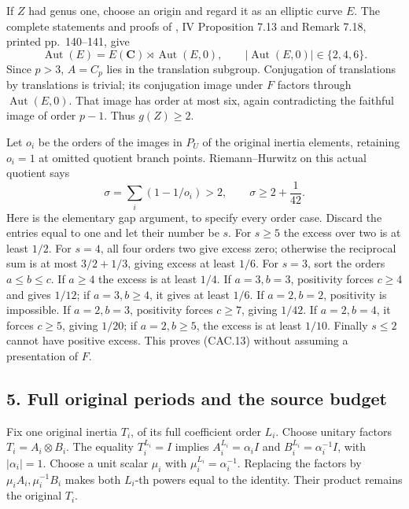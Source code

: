 If \(Z\) had genus one, choose an origin and regard it as an
elliptic curve \(E\). The complete statements and proofs of
\cite{TD:MilneEC2021}, IV Proposition 7.13 and Remark 7.18,
printed pp.~140--141, give
\[
 \operatorname{Aut}(E)
   =E(\mathbf C)\rtimes\operatorname{Aut}(E,0),
 \qquad
 |\operatorname{Aut}(E,0)|\in\{2,4,6\}.
 \tag{CAC.12}
\]
Since \(p>3\), \(A=C_p\) lies in the translation subgroup.
Conjugation of translations by translations is trivial;
its conjugation image under \(F\) factors through
\(\operatorname{Aut}(E,0)\). That image has order at most six,
again contradicting the faithful image of order \(p-1\).
Thus \(g(Z)\ge2\).

Let \(o_i\) be the orders of the images in \(P_U\) of the original
inertia elements, retaining \(o_i=1\) at omitted quotient branch
points. Riemann--Hurwitz on this actual quotient says
\[
 \sigma=\sum_i(1-1/o_i)>2,\qquad
                    \sigma\ge2+\frac1{42}.
 \tag{CAC.13}
\]
Here is the elementary gap argument, to specify every order case.
Discard the entries equal to one and let their number be \(s\).
For \(s\ge5\) the excess over two is at least \(1/2\).
For \(s=4\), all four orders two give excess zero; otherwise
the reciprocal sum is at most \(3/2+1/3\), giving excess at least
\(1/6\). For \(s=3\), sort the orders \(a\le b\le c\).
If \(a\ge4\) the excess is at least \(1/4\).
If \(a=3,b=3\), positivity forces \(c\ge4\) and gives \(1/12\);
if \(a=3,b\ge4\), it gives at least \(1/6\).
If \(a=2,b=2\), positivity is impossible.
If \(a=2,b=3\), positivity forces \(c\ge7\), giving \(1/42\).
If \(a=2,b=4\), it forces \(c\ge5\), giving \(1/20\);
if \(a=2,b\ge5\), the excess is at least \(1/10\).
Finally \(s\le2\) cannot have positive excess.
This proves (CAC.13) without assuming a presentation of \(F\).

\subsection*{5. Full original periods and the source budget}

Fix one original inertia \(T_i\), of its full coefficient order
\(L_i\). Choose unitary factors \(T_i=A_i\otimes B_i\).
The equality \(T_i^{L_i}=I\) implies
\(A_i^{L_i}=\alpha_i I\) and
\(B_i^{L_i}=\alpha_i^{-1}I\), with \(|\alpha_i|=1\).
Choose a unit scalar \(\mu_i\) with
\(\mu_i^{L_i}=\alpha_i^{-1}\).
Replacing the factors by \(\mu_i A_i,\mu_i^{-1}B_i\)
makes both \(L_i\)-th powers equal to the identity.
Their product remains the original \(T_i\).


